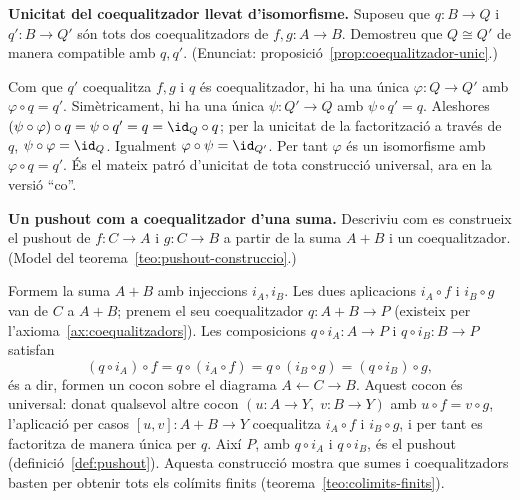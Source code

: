\begin{exercici}
\textbf{Unicitat del coequalitzador llevat d'isomorfisme.} Suposeu que \(q:B\to Q\) i \(q':B\to Q'\) són tots dos coequalitzadors de \(f,g:A\to B\). Demostreu que \(Q\cong Q'\) de manera compatible amb \(q,q'\). (Enunciat: proposició~\ref{prop:coequalitzador-unic}.)
\end{exercici}
\begin{solucio}
Com que \(q'\) coequalitza \(f,g\) i \(q\) és coequalitzador, hi ha una única \(\varphi:Q\to Q'\) amb \(\varphi\circ q=q'\). Simètricament, hi ha una única \(\psi:Q'\to Q\) amb \(\psi\circ q'=q\). Aleshores \((\psi\circ\varphi)\circ q=\psi\circ q'=q=\id_Q\circ q\); per la unicitat de la factorització a través de \(q\), \(\psi\circ\varphi=\id_Q\). Igualment \(\varphi\circ\psi=\id_{Q'}\). Per tant \(\varphi\) és un isomorfisme amb \(\varphi\circ q=q'\). És el mateix patró d'unicitat de tota construcció universal, ara en la versió \enquote{co}.
\end{solucio}

\begin{exercici}
\textbf{Un pushout com a coequalitzador d'una suma.} Descriviu com es construeix el pushout de \(f:C\to A\) i \(g:C\to B\) a partir de la suma \(A+B\) i un coequalitzador. (Model del teorema~\ref{teo:pushout-construccio}.)
\end{exercici}
\begin{solucio}
Formem la suma \(A+B\) amb injeccions \(i_A,i_B\). Les dues aplicacions \(i_A\circ f\) i \(i_B\circ g\) van de \(C\) a \(A+B\); prenem el seu coequalitzador \(q:A+B\to P\) (existeix per l'axioma~\ref{ax:coequalitzadors}). Les composicions \(q\circ i_A:A\to P\) i \(q\circ i_B:B\to P\) satisfan
\[
(q\circ i_A)\circ f=q\circ(i_A\circ f)=q\circ(i_B\circ g)=(q\circ i_B)\circ g,
\]
és a dir, formen un cocon sobre el diagrama \(A\leftarrow C\rightarrow B\). Aquest cocon és universal: donat qualsevol altre cocon \((u:A\to Y,\;v:B\to Y)\) amb \(u\circ f=v\circ g\), l'aplicació per casos \([u,v]:A+B\to Y\) coequalitza \(i_A\circ f\) i \(i_B\circ g\), i per tant es factoritza de manera única per \(q\). Així \(P\), amb \(q\circ i_A\) i \(q\circ i_B\), és el pushout (definició~\ref{def:pushout}). Aquesta construcció mostra que sumes i coequalitzadors basten per obtenir tots els colímits finits (teorema~\ref{teo:colimits-finits}).
\end{solucio}

